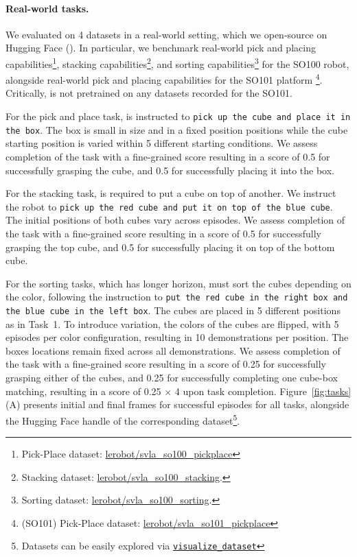 \paragraph{Real-world tasks.} We evaluated \ours on 4 datasets in a real-world setting, which we open-source on Hugging Face (). In particular, we benchmark real-world pick and placing capabilities\footnote{Pick-Place dataset: \href{https://huggingface.co/datasets/lerobot/svla_so100_pickplace}{lerobot/svla\_so100\_pickplace}}, stacking capabilities\footnote{Stacking dataset: \href{https://huggingface.co/datasets/lerobot/svla_so100_stacking}{lerobot/svla\_so100\_stacking}.}, and sorting capabilities\footnote{Sorting dataset: \href{https://huggingface.co/datasets/lerobot/svla_so100_sorting}{lerobot/svla\_so100\_sorting}.} for the SO100 robot, alongside real-world pick and placing capabilities for the SO101 platform \footnote{(SO101) Pick-Place dataset: \href{https://huggingface.co/datasets/lerobot/svla_so101_pickplace}{lerobot/svla\_so101\_pickplace}}. Critically, \ours is not pretrained on any datasets recorded for the SO101.

For the pick and place task, \ours is instructed to \texttt{pick up the cube and place it in the box}. The box is small in size and in a fixed position positions while the cube starting position is varied within 5 different starting conditions. %
We assess completion of the task with a fine-grained score resulting in a score of 0.5 for successfully grasping the cube, and 0.5 for successfully placing it into the box.
 
For the stacking task, \ours is required to put a cube on top of another. We instruct the robot to \texttt{pick up the red cube and put it on top of the blue cube}. The initial positions of both cubes vary across episodes.
We assess completion of the task with a fine-grained score resulting in a score of 0.5 for successfully grasping the top cube, and 0.5 for successfully placing it on top of the bottom cube.

For the sorting tasks, which has longer horizon, \ours must sort the cubes depending on the color, following the instruction to \texttt{put the red cube in the right box and the blue cube in the left box}. The cubes are placed in  5 different positions as in Task~1. To introduce variation, the colors of the cubes are flipped, with 5 episodes per color configuration, resulting in 10 demonstrations per position. The boxes locations remain fixed across all demonstrations. 
We assess completion of the task with a fine-grained score resulting in a score of 0.25 for successfully grasping either of the cubes, and 0.25 for successfully completing one cube-box matching, resulting in a score of 0.25 \( \times \) 4 upon task completion.
Figure~\ref{fig:tasks}(A) presents initial and final frames for successful episodes for all tasks, alongside the Hugging Face handle of the corresponding dataset\footnote{Datasets can be easily explored via \href{https://huggingface.co/spaces/lerobot/visualize_dataset}{\texttt{visualize\_dataset}}}.

